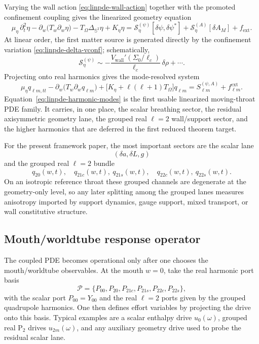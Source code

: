 \documentclass[11pt]{article}
\theoremstyle{definition}
\newcommand{\Ptwo}{\ensuremath{\mathrm{P}_2}}
\newcommand{\wall}{\mathrm{wall}}
\newcommand{\cS}{\mathcal S}
\newcommand{\bbS}{\mathbb S}
\begin{document}
Varying the wall action \eqref{eq:linpde-wall-action} together with the promoted confinement coupling gives the linearized geometry equation
\begin{equation}
\mu_\eta\,\partial_t^2\eta
-
\partial_w\!\bigl(T_w\partial_w\eta\bigr)
-
T_\Omega\Delta_{\bbS^2}\eta
+
K_\eta\eta
=
\cS_\eta^{(\psi)}[\delta\psi,\delta\psi^*]
+
\cS_\eta^{(A)}[\delta A_M]
+
f_{\mathrm{ext}}.
\label{eq:linpde-geometry}
\end{equation}
At linear order, the first matter source is generated directly by the confinement variation \eqref{eq:linpde-delta-vconf}; schematically,
\begin{equation}
\cS_\eta^{(\psi)}
\sim
-\frac{V_{\wall}'(\Sigma_0/\ell_c)}{\ell_c}\,\delta\rho
+\cdots.
\label{eq:linpde-geometry-source}
\end{equation}
Projecting onto real harmonics gives the mode-resolved system
\begin{equation}
\mu_\eta q_{\ell m,tt}
-
\partial_w\!\bigl(T_w\partial_w q_{\ell m}\bigr)
+
\bigl[K_\eta+\ell(\ell+1)T_\Omega\bigr]q_{\ell m}
=
S_{\ell m}^{(\psi,A)}
+
f_{\ell m}^{\mathrm{ext}}.
\label{eq:linpde-harmonic-modes}
\end{equation}
Equation~\eqref{eq:linpde-harmonic-modes} is the first usable linearized moving-throat PDE family. It carries, in one place, the scalar breathing sector, the residual axisymmetric geometry lane, the grouped real $\ell=2$ wall/support sector, and the higher harmonics that are deferred in the first reduced theorem target.

For the present framework paper, the most important sectors are the scalar lane
\[
(\delta a,\delta L,g)
\]
and the grouped real $\ell=2$ bundle
\[
q_{20}(w,t),
\quad
q_{21c}(w,t),\ q_{21s}(w,t),
\quad
q_{22c}(w,t),\ q_{22s}(w,t).
\]
On an isotropic reference throat these grouped channels are degenerate at the geometry-only level, so any later splitting among the grouped lanes measures anisotropy imported by support dynamics, gauge support, mixed transport, or wall constitutive structure.

\subsection{Mouth/worldtube response operator}

The coupled PDE becomes operational only after one chooses the mouth/worldtube observables. At the mouth $w=0$, take the real harmonic port basis
\begin{equation}
\mathcal P=\{P_{00},P_{20},P_{21c},P_{21s},P_{22c},P_{22s}\},
\label{eq:linpde-port-basis}
\end{equation}
with the scalar port $P_{00}=Y_{00}$ and the real $\ell=2$ ports given by the grouped quadrupole harmonics. One then defines effort variables by projecting the drive onto this basis. Typical examples are a scalar enthalpy drive $u_0(\omega)$, grouped real $\Ptwo$ drives $u_{2m}(\omega)$, and any auxiliary geometry drive used to probe the residual scalar lane.
\end{document}
